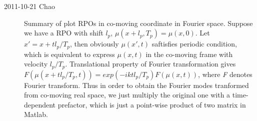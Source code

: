 \begin{description}
\item[2011-10-21 Chao] Summary of plot RPOs in co-moving coordinate in Fourier space. 
Suppose we have a RPO with shift $\textit{$l_p$}$, $\mu(x+\textit{$l_p$},\textit{$T_p$})=\mu(x,0)$. Let $x'=x+t\textit{$l_p$}/\textit{$T_p$}$, then obviously $\mu(x',t)$ saftisfies periodic condition, which is equivalent to express $\mu(x,t)$ in the co-moving frame with velocity $\textit{$l_p$}/\textit{$T_p$}$.  Translational property of Fourier transformation gives $\textit{F}(\mu(x+t\textit{$l_p$}/\textit{$T_p$},\textit{t})) = exp(-ikt\textit{$l_p$}/\textit{$T_p$})\textit{F}(\mu(x,t))$, where \textit{F} denotes Fourier transform. Thus in order to obtain the Fourier modes tranformed from co-moving real space, we just multiply the original one with a time-dependent prefactor, which is just a point-wise product of two matrix in Matlab.  
\end{description}

